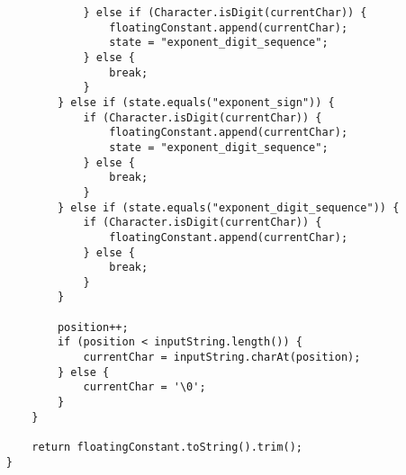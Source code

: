 \documentclass[a4paper, justified]{tufte-handout}
\begin{document}
\begin{solution}
\begin{lstlisting}
                } else if (Character.isDigit(currentChar)) {
                    floatingConstant.append(currentChar);
                    state = "exponent_digit_sequence";
                } else {
                    break;
                }
            } else if (state.equals("exponent_sign")) {
                if (Character.isDigit(currentChar)) {
                    floatingConstant.append(currentChar);
                    state = "exponent_digit_sequence";
                } else {
                    break;
                }
            } else if (state.equals("exponent_digit_sequence")) {
                if (Character.isDigit(currentChar)) {
                    floatingConstant.append(currentChar);
                } else {
                    break;
                }
            }

            position++;
            if (position < inputString.length()) {
                currentChar = inputString.charAt(position);
            } else {
                currentChar = '\0';
            }
        }

        return floatingConstant.toString().trim();
    }


\end{lstlisting}
\end{solution}
\end{document}
